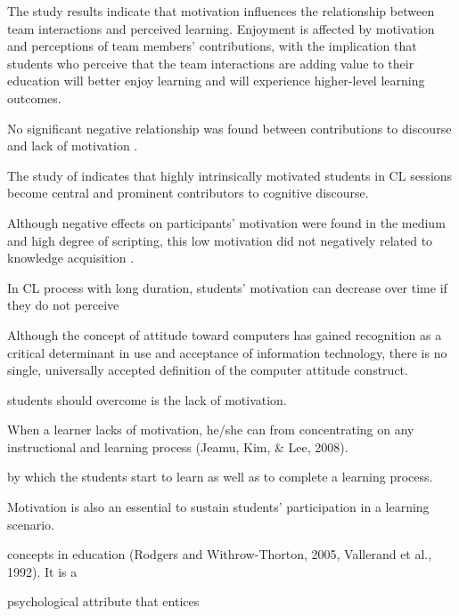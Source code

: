 
The study results indicate that motivation influences the relationship between team interactions and perceived learning. Enjoyment is affected by motivation and perceptions of team members’ contributions, with the implication that students who perceive that the team interactions are adding value to their education will better enjoy learning and will experience higher-level learning outcomes.

\cite{GomezWuPasserini2010}



No significant negative relationship was found between contributions to discourse and lack of motivation \cite{RientiesTempelaardenBosscheGijselaersSegers2009}.

The study of  indicates that highly intrinsically motivated students in CL sessions become central and prominent contributors to cognitive discourse.
 

Although negative effects on participants' motivation were found in the medium and high degree of scripting, this low motivation did not negatively related to knowledge acquisition \cite{StegmannMuGehlen-BaumFischer2011}.




In CL process with long duration, students' motivation can decrease over time if they do not perceive



Although the concept of attitude toward computers has gained recognition as a critical determinant in use and acceptance of information technology, there is no single, universally accepted definition of the computer attitude construct.


students should overcome is the lack of motivation.



When a learner lacks of motivation, he/she can from concentrating on any instructional and learning process (Jeamu, Kim, & Lee, 2008).


by which the students start to learn as well as to complete a learning process.


Motivation is also an essential to sustain students' participation in a learning scenario. 



concepts in  education (Rodgers and Withrow-Thorton, 2005, Vallerand et al., 1992). It is a 


psychological attribute that entices 

